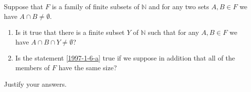 \documentclass{article}
\begin{document}
\setlength{\parindent}{0pt}
Suppose that $F$ is a family of finite subsets of $\mathbb{N}$ and for any two sets $A,B\in F$ we have $A\cap B\neq \emptyset$.
\begin{enumerate}[label=\alph*)]
\item Is it true that there is a finite subset $Y$ of $\mathbb{N}$ such that for any $A,B\in F$ we have $A\cap B\cap Y \neq \emptyset$? \label{1997-1-6-a}
\item Is the statement \ref{1997-1-6-a} true if we suppose in addition that all of the members of $F$ have the same size?
\end{enumerate}
Justify your answers.
\end{document}
